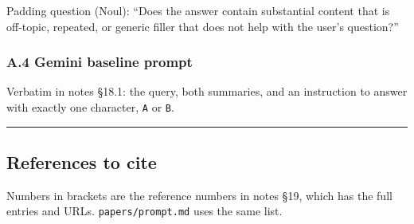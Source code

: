 \documentclass[
  10pt,
]{article}
\newcommand{\passthrough}[1]{#1}
\begin{document}
Padding question (Noul): ``Does the answer contain substantial content
that is off-topic, repeated, or generic filler that does not help with
the user's question?''

\subsubsection{A.4 Gemini baseline
prompt}\label{a.4-gemini-baseline-prompt}

Verbatim in notes §18.1: the query, both summaries, and an instruction
to answer with exactly one character, \passthrough{\lstinline!A!} or
\passthrough{\lstinline!B!}.

\begin{center}\rule{0.5\linewidth}{0.5pt}\end{center}

\subsection{References to cite}\label{references-to-cite}

Numbers in brackets are the reference numbers in notes §19, which has
the full entries and URLs. \passthrough{\lstinline!papers/prompt.md!}
uses the same list.
\end{document}
